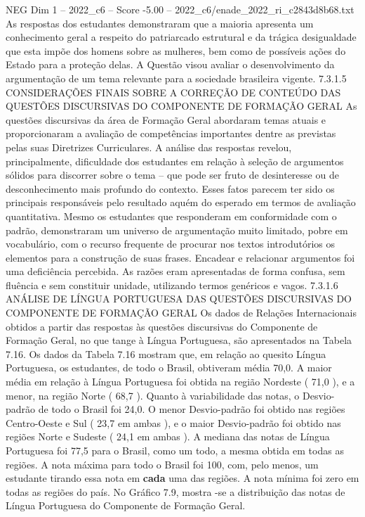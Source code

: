 \begin{textsample}{NEG Dim 1 – 2022\_c6 – Score -5.00 – 2022\_c6/enade\_2022\_ri\_c2843d8b68.txt}
As respostas dos estudantes demonstraram que a maioria apresenta um conhecimento geral a respeito do patriarcado estrutural e da trágica desigualdade que esta impõe dos homens sobre as mulheres, bem como de possíveis ações do Estado para a proteção delas.
A Questão visou avaliar o desenvolvimento da argumentação de um tema relevante para a sociedade brasileira vigente. 7.3.1.5 CONSIDERAÇÕES FINAIS SOBRE A CORREÇÃO DE CONTEÚDO DAS QUESTÕES DISCURSIVAS DO COMPONENTE DE FORMAÇÃO GERAL As questões discursivas da área de Formação Geral abordaram temas atuais e proporcionaram a avaliação de competências importantes dentre as previstas pelas suas Diretrizes Curriculares.
A análise das respostas revelou, principalmente, dificuldade dos estudantes em relação à seleção de argumentos sólidos para discorrer sobre o tema – que pode ser fruto de desinteresse ou de desconhecimento mais profundo do contexto.
Esses fatos parecem ter sido os principais responsáveis pelo resultado aquém do esperado em termos de avaliação quantitativa.
Mesmo os estudantes que responderam em conformidade com o padrão, demonstraram um universo de argumentação muito limitado, pobre em vocabulário, com o recurso frequente de procurar nos textos introdutórios os elementos para a construção de suas frases.
Encadear e relacionar argumentos foi uma deficiência percebida.
As razões eram apresentadas de forma confusa, sem fluência e sem constituir unidade, utilizando termos genéricos e vagos. 7.3.1.6 ANÁLISE DE LÍNGUA PORTUGUESA DAS QUESTÕES DISCURSIVAS DO COMPONENTE DE FORMAÇÃO GERAL Os dados de Relações Internacionais obtidos a partir das respostas às questões discursivas do Componente de Formação Geral, no que tange à Língua Portuguesa, são apresentados na Tabela 7.16.
Os dados da Tabela 7.16 mostram que, em relação ao quesito Língua Portuguesa, os estudantes, de todo o Brasil, obtiveram média 70,0.
A maior média em relação à Língua Portuguesa foi obtida na região Nordeste ( 71,0 ), e a menor, na região Norte ( 68,7 ).
Quanto à variabilidade das notas, o Desvio-padrão de todo o Brasil foi 24,0.
O menor Desvio-padrão foi obtido nas regiões Centro-Oeste e Sul ( 23,7 em ambas ), e o maior Desvio-padrão foi obtido nas regiões Norte e Sudeste ( 24,1 em ambas ).
A mediana das notas de Língua Portuguesa foi 77,5 para o Brasil, como um todo, a mesma obtida em todas as regiões.
A nota máxima para todo o Brasil foi 100, com, pelo menos, um estudante tirando essa nota em \textbf{cada} uma das regiões.
A nota mínima foi zero em todas as regiões do país.
No Gráfico 7.9, mostra -se a distribuição das notas de Língua Portuguesa do Componente de Formação Geral.

\end{textsample}
